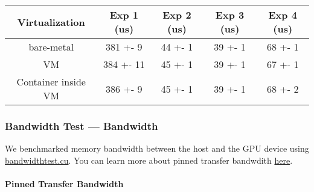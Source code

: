 \begin{longtable}[c]{@{}ccccc@{}}
\toprule
Virtualization & Exp 1 (us) & Exp 2 (us) & Exp 3 (us) & Exp 4
(us)\tabularnewline
\midrule
\endhead
bare-metal & 381 +- 9 & 44 +- 1 & 39 +- 1 & 68 +- 1\tabularnewline
VM & 384 +- 11 & 45 +- 1 & 39 +- 1 & 67 +- 1\tabularnewline
Container inside VM & 386 +- 9 & 45 +- 1 & 39 +- 1 & 68 +-
2\tabularnewline
\bottomrule
\end{longtable}

\subsubsection{Bandwidth Test ---
Bandwidth}\label{bandwidth-test-bandwidth}

We benchmarked memory bandwidth between the host and the GPU device
using
\href{https://github.com/parallel-forall/code-samples/blob/master/series/cuda-cpp/optimize-data-transfers/bandwidthtest.cu}{bandwidthtest.cu}.
You can learn more about pinned transfer bandwdith
\href{https://devblogs.nvidia.com/how-optimize-data-transfers-cuda-cc/}{here}.

\paragraph{Pinned Transfer Bandwidth}\label{pinned-transfer-bandwidth}

